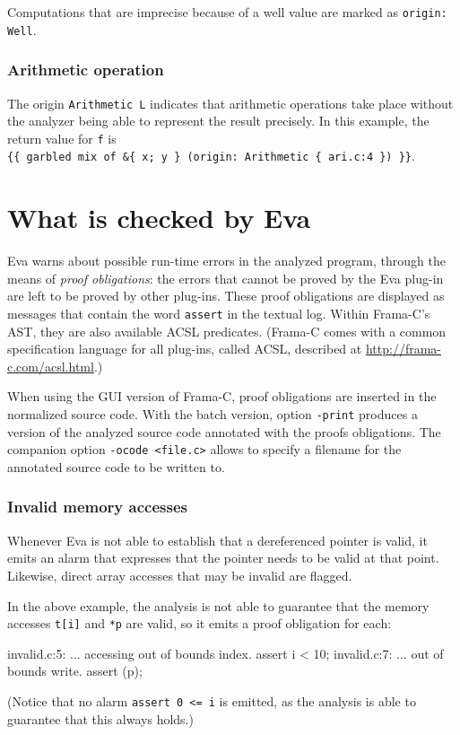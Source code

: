 \documentclass[web]{frama-c-book}
\newcommand{\Eva}{\textsf{Eva}}
\begin{document}
Computations that are imprecise because of a well value are marked
as \lstinline|origin: Well|.

\subsubsection{Arithmetic operation}
The origin \lstinline$Arithmetic L$
indicates that arithmetic operations
take place without the analyzer being able to represent the result
precisely.
In this example, the return value for \lstinline|f| is\\
\lstinline|{{ garbled mix of &{ x; y } (origin: Arithmetic { ari.c:4 }) }}|.


\section{What is checked by \Eva{}}\label{obligations}

\Eva{} warns about possible run-time errors in the analyzed
program, through the means of \emph{proof obligations}: the errors that cannot
be proved by the \Eva{} plug-in are left to be proved by other plug-ins.
These proof obligations
are displayed as messages that contain the word \lstinline|assert| in
the textual log. Within Frama-C's AST, they are also available ACSL predicates.
(Frama-C comes with a common specification language for all plug-ins,
called ACSL, described at \url{http://frama-c.com/acsl.html}.)

When using the GUI version of Frama-C, proof obligations are 
inserted in the normalized source code. With the batch version,
option \lstinline|-print| produces a version of the analyzed source code
annotated with the proofs obligations.  The companion option 
\lstinline|-ocode <file.c>| allows to specify a filename for the 
annotated source code to be written to.

\subsubsection{Invalid memory accesses}
Whenever \Eva{} is not able to establish that
a dereferenced pointer is valid, it emits an alarm that expresses
that the pointer needs to be valid at that point. Likewise, direct
array accesses that may be invalid are flagged. 

In the above example, the analysis is not able to guarantee that
the memory accesses \lstinline|t[i]| and \lstinline|*p| are valid, 
so it emits a proof obligation for each:
\begin{logs}
invalid.c:5: ... accessing out of bounds index. assert i < 10;
invalid.c:7: ... out of bounds write. assert \valid(p);
\end{logs}
(Notice that no alarm \lstinline|assert 0 <= i| is emitted, as the
analysis is able to guarantee that this always holds.)
\end{document}
